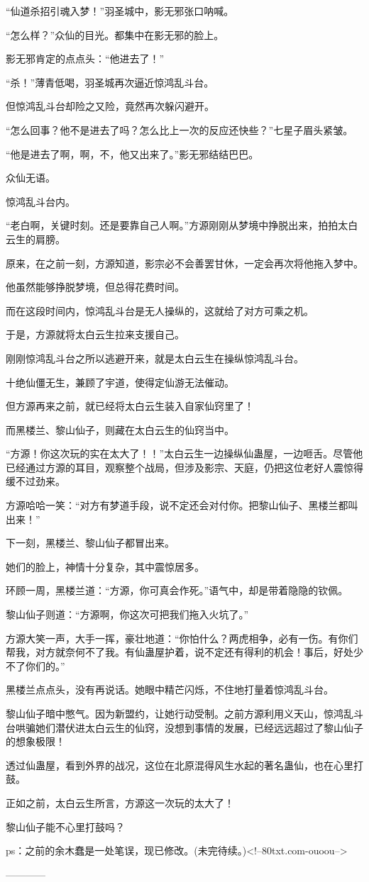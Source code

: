 \begin{this_body}
“仙道杀招引魂入梦！”羽圣城中，影无邪张口呐喊。

“怎么样？”众仙的目光。都集中在影无邪的脸上。

影无邪肯定的点点头：“他进去了！”

“杀！”薄青低喝，羽圣城再次逼近惊鸿乱斗台。

但惊鸿乱斗台却险之又险，竟然再次躲闪避开。

“怎么回事？他不是进去了吗？怎么比上一次的反应还快些？”七星子眉头紧皱。

“他是进去了啊，啊，不，他又出来了。”影无邪结结巴巴。

众仙无语。

惊鸿乱斗台内。

“老白啊，关键时刻。还是要靠自己人啊。”方源刚刚从梦境中挣脱出来，拍拍太白云生的肩膀。

原来，在之前一刻，方源知道，影宗必不会善罢甘休，一定会再次将他拖入梦中。

他虽然能够挣脱梦境，但总得花费时间。

而在这段时间内，惊鸿乱斗台是无人操纵的，这就给了对方可乘之机。

于是，方源就将太白云生拉来支援自己。

刚刚惊鸿乱斗台之所以逃避开来，就是太白云生在操纵惊鸿乱斗台。

十绝仙僵无生，兼顾了宇道，使得定仙游无法催动。

但方源再来之前，就已经将太白云生装入自家仙窍里了！

而黑楼兰、黎山仙子，则藏在太白云生的仙窍当中。

“方源！你这次玩的实在太大了！！”太白云生一边操纵仙蛊屋，一边咂舌。尽管他已经通过方源的耳目，观察整个战局，但涉及影宗、天庭，仍把这位老好人震惊得缓不过劲来。

方源哈哈一笑：“对方有梦道手段，说不定还会对付你。把黎山仙子、黑楼兰都叫出来！”

下一刻，黑楼兰、黎山仙子都冒出来。

她们的脸上，神情十分复杂，其中震惊居多。

环顾一周，黑楼兰道：“方源，你可真会作死。”语气中，却是带着隐隐的钦佩。

黎山仙子则道：“方源啊，你这次可把我们拖入火坑了。”

方源大笑一声，大手一挥，豪壮地道：“你怕什么？两虎相争，必有一伤。有你们帮我，对方就奈何不了我。有仙蛊屋护着，说不定还有得利的机会！事后，好处少不了你们的。”

黑楼兰点点头，没有再说话。她眼中精芒闪烁，不住地打量着惊鸿乱斗台。

黎山仙子暗中憋气。因为新盟约，让她行动受制。之前方源利用义天山，惊鸿乱斗台哄骗她们潜伏进太白云生的仙窍，没想到事情的发展，已经远远超过了黎山仙子的想象极限！

透过仙蛊屋，看到外界的战况，这位在北原混得风生水起的著名蛊仙，也在心里打鼓。

正如之前，太白云生所言，方源这一次玩的太大了！

黎山仙子能不心里打鼓吗？

ps：之前的余木蠢是一处笔误，现已修改。(未完待续。)<!--80txt.com-ouoou-->

------------

\end{this_body}

